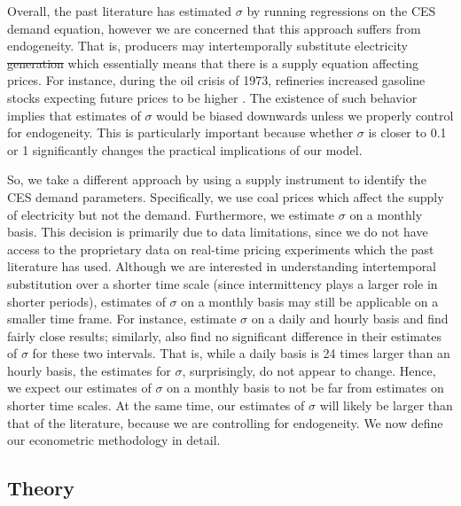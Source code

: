 \documentclass[11pt,a4paper,leqno]{extarticle}
\providecommand{\DIFadd}[1]{{\protect\color{blue}\uwave{#1}}} %
\providecommand{\DIFdel}[1]{{\protect\color{red}\sout{#1}}}                      %
\providecommand{\DIFaddbegin}{} %
\providecommand{\DIFaddend}{} %
\providecommand{\DIFdelbegin}{} %
\providecommand{\DIFdelend}{} %
\begin{document}
	Overall, the past literature has estimated $\sigma$ by running regressions on the CES demand equation, however we are concerned that this approach suffers from endogeneity. That is, producers may intertemporally substitute electricity \DIFdelbegin \DIFdel{generation }\DIFdelend \DIFaddbegin \DIFadd{output }\DIFaddend which essentially means that there is a supply equation affecting prices. For instance, during the oil crisis of 1973, refineries increased gasoline stocks expecting future prices to be higher \citep{genie}. The existence of such behavior implies that estimates of $\sigma$ would be biased downwards unless we properly control for endogeneity. This is particularly important because whether $\sigma$ is closer to 0.1 or 1 significantly changes the practical implications of our model. 
	
	So, we take a different approach by using a supply instrument to identify the CES demand parameters. Specifically, we use coal prices which affect the supply of electricity but not the demand. Furthermore, we estimate $\sigma$ on a monthly basis. This decision is primarily due to data limitations, since we do  not have access to the proprietary data on real-time pricing experiments which the past literature has used. Although we are interested in understanding intertemporal substitution over a shorter time scale (since intermittency plays a larger role in shorter periods), estimates of $\sigma$ on a monthly basis may still be applicable on a smaller time frame. For instance, \citet{Schwarz} estimate $\sigma$ on a daily and hourly basis and find fairly close results; similarly, \citet{Herriges} also find no significant difference in their estimates of $\sigma$ for these two intervals. That is, while a daily basis is 24 times larger than an hourly basis, the estimates for $\sigma$, surprisingly, do not appear to change. Hence, we expect our estimates of $\sigma$ on a monthly basis to not be far from estimates on shorter time scales. At the same time, our estimates of $\sigma$ will likely be larger than that of the literature, because we are controlling for endogeneity. We now define our econometric methodology in detail.
	
	\subsection{Theory}
	
\end{document}
